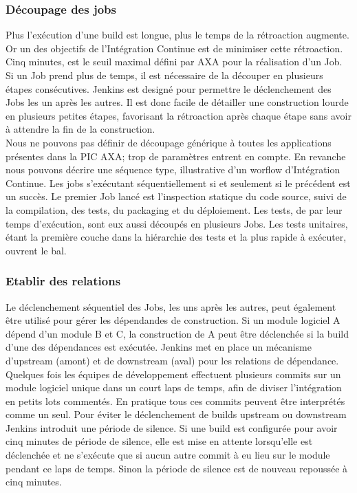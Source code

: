       \subsubsection{Découpage des jobs}
      Plus l'exécution d'une build est longue, plus le temps de la rétroaction augmente. Or un des objectifs de l'Intégration Continue est de minimiser cette rétroaction. Cinq minutes, est le seuil maximal défini par AXA pour la réalisation d'un Job. Si un Job prend plus de temps, il est nécessaire de la découper en plusieurs étapes consécutives. Jenkins est designé pour permettre le déclenchement des Jobs les un après les autres. Il est donc facile de détailler une construction lourde en plusieurs petites étapes, favorisant la rétroaction après chaque étape sans avoir à attendre la fin de la construction. \\

      Nous ne pouvons pas définir de découpage générique à toutes les applications présentes dans la PIC AXA; trop de paramètres entrent en compte. En revanche nous pouvons décrire une séquence type, illustrative d'un worflow d'Intégration Continue. Les jobs s'exécutant séquentiellement si et seulement si le précédent est un succès. Le premier Job lancé est l'inspection statique du code source, suivi de la compilation, des tests, du packaging et du déploiement. Les tests, de par leur temps d'exécution, sont eux aussi découpés en plusieurs Jobs. Les tests unitaires, étant la première couche dans la hiérarchie des tests et la plus rapide à exécuter, ouvrent le bal.

      \subsubsection{Etablir des relations}
      Le déclenchement séquentiel des Jobs, les uns après les autres, peut également être utilisé pour gérer les dépendandes de construction. Si un module logiciel A dépend d'un module B et C, la construction de A peut être déclenchée si la build d'une des dépendances est exécutée. Jenkins met en place un mécanisme d'upstream (amont) et de downstream (aval) pour les relations de dépendance. Quelques fois les équipes de développement effectuent plusieurs commits sur un module logiciel unique dans un court laps de temps, afin de diviser l'intégration en petits lots commentés. En pratique tous ces commits peuvent être interprétés comme un seul. Pour éviter le déclenchement de builds upstream ou downstream Jenkins introduit une période de silence. Si une build est configurée pour avoir cinq minutes de période de silence, elle est mise en attente lorsqu'elle est déclenchée et ne s'exécute que si aucun autre commit à eu lieu sur le module pendant ce laps de temps. Sinon la période de silence est de nouveau repoussée à cinq minutes.\\

